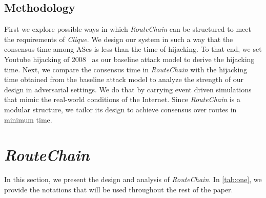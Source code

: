 \documentclass[5p]{elsarticle}
\newcommand{\rc}{{{\em RouteChain}}\xspace}
\begin{document}
\subsection{Methodology}\label{sec:method}
First we explore possible ways in which \rc can be structured to meet the requirements of {\em Clique}. We design our system in such a way that the consensus time among ASes is less than the time of hijacking. To that end, we set Youtube hijacking of 2008~\cite{GoldbergS14} as our baseline attack model to derive the hijacking time. Next, we compare the consensus time in \rc with the hijacking time obtained from the baseline attack model to analyze the strength of our design in adversarial settings. We do that by carrying event driven simulations that mimic the real-world conditions of the Internet. Since \rc is a modular structure, we tailor its design to achieve consensus over routes in minimum time. 




\section{\rc}\label{sec:rc}
In this section, we present the design and analysis of \rc. In \autoref{tab:one}, we provide the notations that will be used throughout the rest of the paper.  
\end{document}
